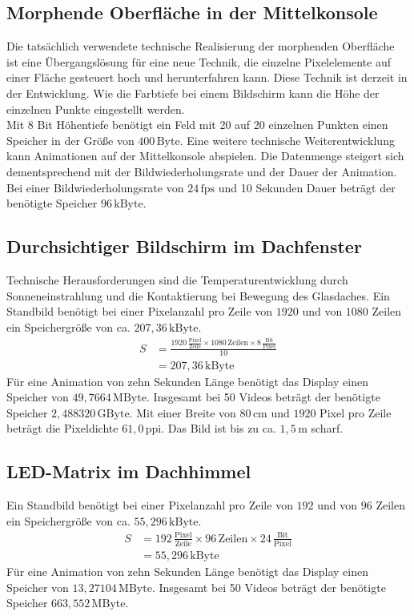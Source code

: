 \subsection{Morphende Oberfläche in der Mittelkonsole}
Die tatsächlich verwendete technische Realisierung der morphenden Oberfläche ist eine Übergangslösung für eine neue Technik, die einzelne Pixelelemente auf einer Fläche gesteuert hoch und herunterfahren kann. Diese Technik ist derzeit in der Entwicklung. Wie die Farbtiefe bei einem Bildschirm kann die Höhe der einzelnen Punkte eingestellt werden. \\
Mit 8 Bit Höhentiefe benötigt ein Feld mit 20 auf 20 einzelnen Punkten einen Speicher in der Größe von $ 400\,\mathrm{Byte}$.
Eine weitere technische Weiterentwicklung kann Animationen auf der Mittelkonsole abspielen. Die Datenmenge steigert sich dementsprechend mit der Bildwiederholungsrate und der Dauer der Animation. Bei einer Bildwiederholungsrate von $ 24\,\mathrm{fps} $ und 10 Sekunden Dauer beträgt der benötigte Speicher $ 96\,\mathrm{kByte}$.
\subsection{Durchsichtiger Bildschirm im Dachfenster} 
Technische Herausforderungen sind die Temperaturentwicklung durch Sonneneinstrahlung und die Kontaktierung bei Bewegung des Glasdaches. 
Ein Standbild benötigt bei einer Pixelanzahl pro Zeile von $ 1920 $ und von $ 1080 $ Zeilen ein Speichergröße von ca. $ 207,36\,\mathrm{kByte}$. 
\begin{align}
	S &= \frac{1920\,\frac{\mathrm{Pixel}}{\mathrm{Zeile}}\times 1080\,\mathrm{Zeilen} \times 8\,\frac{\mathrm{Bit}}{\mathrm{Pixel}}}{10} \\
	&= 207,36\,\mathrm{kByte}
\end{align}
Für eine Animation von zehn Sekunden Länge benötigt das Display einen Speicher von $ 49,7664\,\mathrm{MByte}$.
Insgesamt bei 50 Videos beträgt der benötigte Speicher $ 2,488320\,\mathrm{GByte}$.
Mit einer Breite von $ 80\,\mathrm{cm} $ und $ 1920 $ Pixel pro Zeile beträgt die Pixeldichte $ 61,0\,\mathrm{ppi} $. Das Bild ist bis zu ca. $ 1,5\,\mathrm{m} $ scharf.
\subsection{LED-Matrix im Dachhimmel}
Ein Standbild benötigt bei einer Pixelanzahl pro Zeile von $ 192 $ und von $ 96 $ Zeilen ein Speichergröße von ca. $ 55,296\,\mathrm{kByte}$. 
\begin{align}
	S &= 192\,\frac{\mathrm{Pixel}}{\mathrm{Zeile}}\times 96\,\mathrm{Zeilen} \times 24\,\frac{\mathrm{Bit}}{\mathrm{Pixel}} \\
	&= 55,296\,\mathrm{kByte}
\end{align}
Für eine Animation von zehn Sekunden Länge benötigt das Display einen Speicher von $ 13,27104\,\mathrm{MByte}$.
Insgesamt bei 50 Videos beträgt der benötigte Speicher $ 663,552\,\mathrm{MByte}$.
